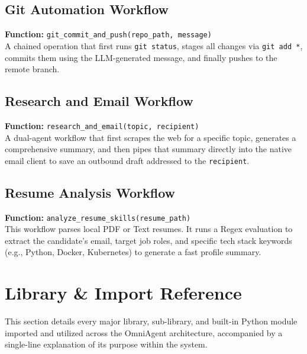 \documentclass[11pt,a4paper]{report}
\begin{document}
\section{Git Automation Workflow}
\textbf{Function:} \texttt{git\_commit\_and\_push(repo\_path, message)}\\
A chained operation that first runs \texttt{git status}, stages all changes via \texttt{git add *}, commits them using the LLM-generated message, and finally pushes to the remote branch. 

\section{Research and Email Workflow}
\textbf{Function:} \texttt{research\_and\_email(topic, recipient)}\\
A dual-agent workflow that first scrapes the web for a specific topic, generates a comprehensive summary, and then pipes that summary directly into the native email client to save an outbound draft addressed to the \texttt{recipient}.

\section{Resume Analysis Workflow}
\textbf{Function:} \texttt{analyze\_resume\_skills(resume\_path)}\\
This workflow parses local PDF or Text resumes. It runs a Regex evaluation to extract the candidate's email, target job roles, and specific tech stack keywords (e.g., Python, Docker, Kubernetes) to generate a fast profile summary.

\chapter{Library \& Import Reference}
This section details every major library, sub-library, and built-in Python module imported and utilized across the OmniAgent architecture, accompanied by a single-line explanation of its purpose within the system.
\end{document}
